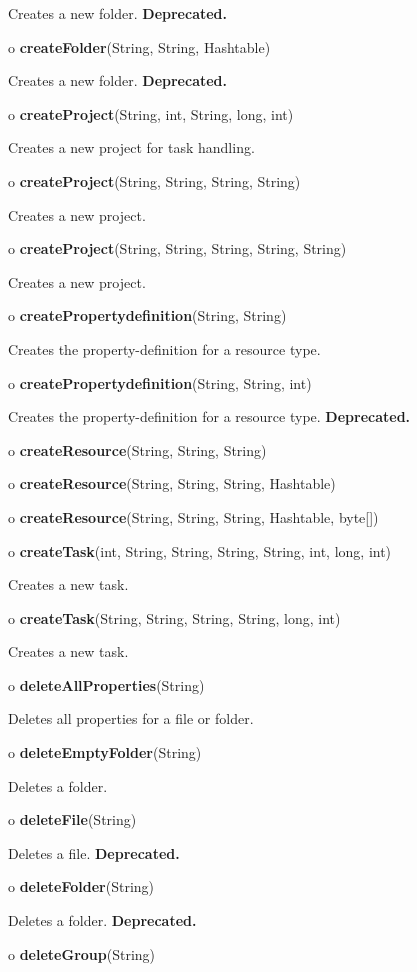 \begin{description}
Creates a new folder. {\bf Deprecated.}
\item o {\bf createFolder}(String, String, Hashtable)

Creates a new folder. {\bf Deprecated.}
\item o {\bf createProject}(String, int, String, long, int)

Creates a new project for task handling.
\item o {\bf createProject}(String, String, String, String)

Creates a new project.
\item o {\bf createProject}(String, String, String, String, String)

Creates a new project.
\item o {\bf createPropertydefinition}(String, String)

Creates the property-definition for a resource type.
\item o {\bf createPropertydefinition}(String, String, int)

Creates the property-definition for a resource type. {\bf Deprecated.}
\item o {\bf createResource}(String, String, String)

\item o {\bf createResource}(String, String, String, Hashtable)

\item o {\bf createResource}(String, String, String, Hashtable, byte[])

\item o {\bf createTask}(int, String, String, String, String, int, long, int)


Creates a new task.
\item o {\bf createTask}(String, String, String, String, long, int)

Creates a new task.
\item o {\bf deleteAllProperties}(String)

Deletes all properties for a file or folder.
\item o {\bf deleteEmptyFolder}(String)

Deletes a folder.
\item o {\bf deleteFile}(String)

Deletes a file. {\bf Deprecated.}
\item o {\bf deleteFolder}(String)

Deletes a folder. {\bf Deprecated.}
\item o {\bf deleteGroup}(String)


\end{description}

